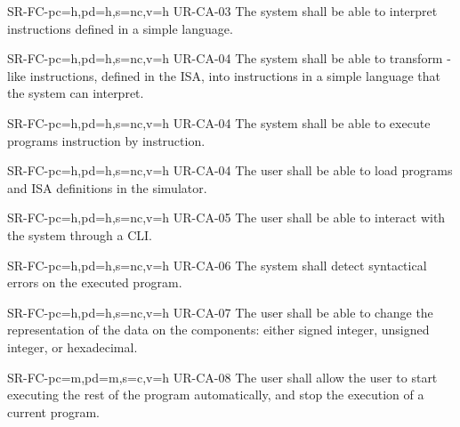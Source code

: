 \begin{softwareReq}{SR-FC-}{pc=h,pd=h,s=nc,v=h}
  {UR-CA-03}
  The system shall be able to interpret instructions defined in a simple language.
\end{softwareReq}

\begin{softwareReq}{SR-FC-}{pc=h,pd=h,s=nc,v=h}
  {UR-CA-04}
  The system shall be able to transform -like instructions, defined in the \gls{ISA}, into instructions in a simple language that the system can interpret.
\end{softwareReq}

\begin{softwareReq}{SR-FC-}{pc=h,pd=h,s=nc,v=h}
  {UR-CA-04}
  The system shall be able to execute programs instruction by instruction.
\end{softwareReq}

\begin{softwareReq}{SR-FC-}{pc=h,pd=h,s=nc,v=h}
  {UR-CA-04}
  The user shall be able to load programs and \gls{ISA} definitions in the simulator.
\end{softwareReq}

\begin{softwareReq}{SR-FC-}{pc=h,pd=h,s=nc,v=h}
  {UR-CA-05}
  The user shall be able to interact with the system through a \gls{CLI}.
\end{softwareReq}

\begin{softwareReq}{SR-FC-}{pc=h,pd=h,s=nc,v=h}
  {UR-CA-06}
  The system shall detect syntactical errors on the executed program.
\end{softwareReq}

\begin{softwareReq}{SR-FC-}{pc=h,pd=h,s=nc,v=h}
  {UR-CA-07}
  The user shall be able to change the representation of the data on the components: either signed integer, unsigned integer, or hexadecimal.
\end{softwareReq}

\begin{softwareReq}{SR-FC-}{pc=m,pd=m,s=c,v=h}
  {UR-CA-08}
  The user shall allow the user to start executing the rest of the program automatically, and stop the execution of a current program.
\end{softwareReq}



